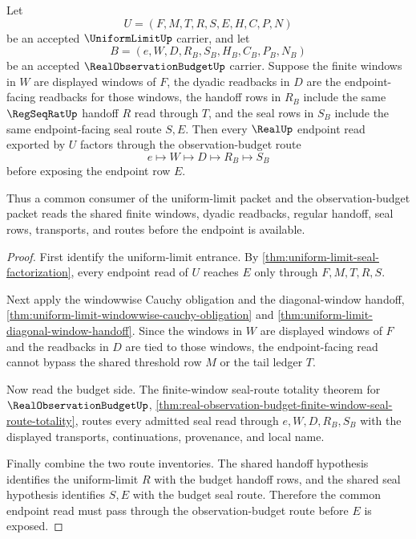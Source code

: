 \begin{theorem}
\label{thm:uniform-limit-observation-budget-factorization}
Let
$$
U=(F,M,T,R,S,E,H,C,P,N)
$$
be an accepted $\UniformLimitUp$ carrier, and let
$$
B=(e,W,D,R_B,S_B,H_B,C_B,P_B,N_B)
$$
be an accepted $\RealObservationBudgetUp$ carrier. Suppose the finite windows in $W$ are displayed windows of $F$, the dyadic readbacks in $D$ are the endpoint-facing readbacks for those windows, the handoff rows in $R_B$ include the same $\RegSeqRatUp$ handoff $R$ read through $T$, and the seal rows in $S_B$ include the same endpoint-facing seal route $S,E$. Then every $\RealUp$ endpoint read exported by $U$ factors through the observation-budget route
$$
e \longmapsto W \longmapsto D \longmapsto R_B \longmapsto S_B
$$
before exposing the endpoint row $E$.

Thus a common consumer of the uniform-limit packet and the observation-budget packet reads the shared finite windows, dyadic readbacks, regular handoff, seal rows, transports, and routes before the endpoint is available.
\end{theorem}
\begin{proof}
First identify the uniform-limit entrance. By \autoref{thm:uniform-limit-seal-factorization}, every endpoint read of $U$ reaches $E$ only through $F,M,T,R,S$.

Next apply the windowwise Cauchy obligation and the diagonal-window handoff, \autoref{thm:uniform-limit-windowwise-cauchy-obligation} and \autoref{thm:uniform-limit-diagonal-window-handoff}. Since the windows in $W$ are displayed windows of $F$ and the readbacks in $D$ are tied to those windows, the endpoint-facing read cannot bypass the shared threshold row $M$ or the tail ledger $T$.

Now read the budget side. The finite-window seal-route totality theorem for $\RealObservationBudgetUp$, \autoref{thm:real-observation-budget-finite-window-seal-route-totality}, routes every admitted seal read through $e,W,D,R_B,S_B$ with the displayed transports, continuations, provenance, and local name.

Finally combine the two route inventories. The shared handoff hypothesis identifies the uniform-limit $R$ with the budget handoff rows, and the shared seal hypothesis identifies $S,E$ with the budget seal route. Therefore the common endpoint read must pass through the observation-budget route before $E$ is exposed.
\end{proof}

